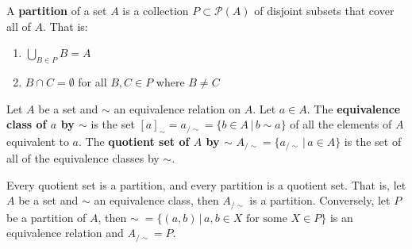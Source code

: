 \documentclass{bareminimum}
\begin{document}
\begin{defn}[Partitions]
	A \textbf{partition}  of a set $A$ is a collection $P \subset \mathcal{P}(A)$ of disjoint subsets that cover all of $A$. That is:
	\begin{enumerate}
		\item $\bigcup\limits_{B \in P} B = A$
		\item $B \cap C = \emptyset$ for all $B, C \in P$ where $B \neq C$
	\end{enumerate}
\end{defn}


\begin{defn}
	Let $A$  be a set and $\sim$ an equivalence relation on $A$. Let $a \in A$. The \textbf{equivalence class of $a$ by $\sim$} is the set $[a]_{\sim} = a_{/\sim} = \{b \in A \, | \, b \sim a \}$ of all the elements of $A$ equivalent to $a$. The \textbf{quotient set of $A$ by $\sim$} $A_{/\sim} = \{ a_{/\sim} \, | \, a \in A \}$  is the set of all of the equivalence classes by $\sim$.
\end{defn}

\begin{prop}
	Every quotient set is a partition, and every partition is a quotient set. That is, let $A$ be a set and $\sim$ an equivalence class, then $A_{/\sim}$ is a partition. Conversely, let $P$ be a partition of $A$, then $\sim \; = \{ (a,b) \, | \, a, b \in X \text{ for some } X \in P \} $ is an equivalence relation and $A_{/\sim} = P$.
\end{prop}
\end{document}

